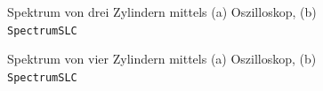 \begin{figure}
    \caption{Spektrum von drei Zylindern mittels (a) Oszilloskop, (b) \texttt{SpectrumSLC}}
\end{figure}
\begin{figure}
    \caption{Spektrum von vier Zylindern mittels (a) Oszilloskop, (b) \texttt{SpectrumSLC}}
\end{figure}
